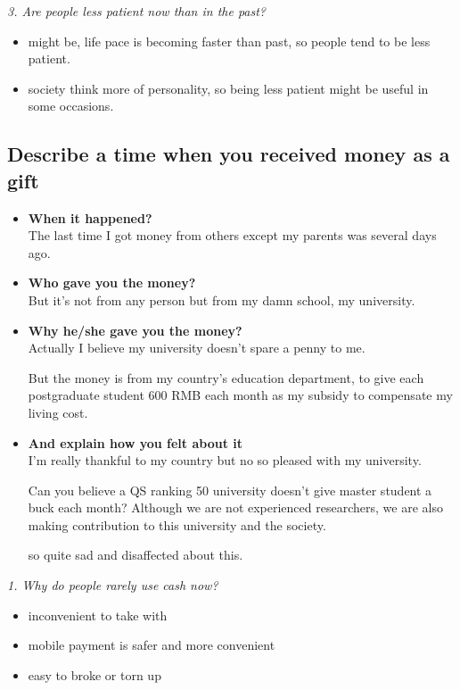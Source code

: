 \documentclass[conference]{IEEEtran}
\begin{document}
\textit{3. Are people less patient now than in the past?}
\begin{itemize}
    \item might be, life pace is becoming faster than past, so people tend to be less patient.
    \item society think more of personality, so being less patient might be useful in some occasions.
\end{itemize}

\subsection{Describe a time when you received money as a gift}
\begin{itemize}
    \item \textbf{When it happened?}\\
    The last time I got money from others except my parents was several days ago.
    \item \textbf{Who gave you the money?}\\
    But it's not from any person but from my damn school, my university.
    \item \textbf{Why he/she gave you the money?}\\
    Actually I believe my university doesn't spare a penny to me.

    But the money is from my country's education department, to give each postgraduate student 600 RMB each month as
    my subsidy to compensate my living cost.
    \item \textbf{And explain how you felt about it}\\
    I'm really thankful to my country but no so pleased with my university.

    Can you believe a QS ranking 50 university doesn't give master student a buck each month?
    Although we are not experienced researchers, we are also making contribution to this university and the society.

    so quite sad and disaffected about this.
\end{itemize}

\textit{1. Why do people rarely use cash now?}
\begin{itemize}
    \item inconvenient to take with
    \item mobile payment is safer and more convenient
    \item easy to broke or torn up
\end{itemize}
\end{document}
